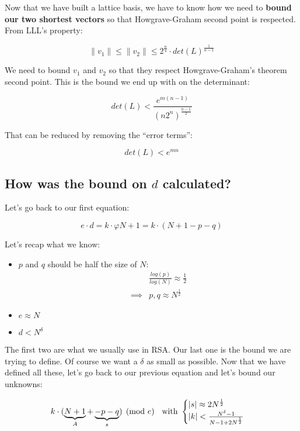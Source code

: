 \documentclass[a4paper,11pt]{article}
\begin{document}
Now that we have built a lattice basis, we have to know how we need to \textbf{bound our two shortest vectors} so that Howgrave-Graham second point is respected. From LLL's property:

\[ \|v_1\| \leq \|v_2\| \leq 2^{\frac{n}{4}} \cdot det(L)^{\frac{1}{n-1}} \]

We need to bound $v_1$ and $v_2$ so that they respect Howgrave-Graham's theorem second point. This is the bound we end up with on the determinant:

\[ det(L) < \frac{e^{m(n-1)}}{(n2^n)^{\frac{n-1}{2}}} \]

That can be reduced by removing the ``error terms'':

\[ det(L) < e^{mn} \]

\subsection{How was the bound on $d$ calculated?}\label{bound-boneh-durfee}

Let's go back to our first equation:

\[ e \cdot d = k \cdot \varphi{N} + 1 = k \cdot (N + 1 - p - q) \]

Let's recap what we know:

\begin{itemize}
	\item{$p$ and $q$ should be half the size of $N$:\\
	\begin{align*}
		 &\frac{log(p)}{log(N)} \approx \frac{1}{2}\\
		 \implies &p,q \approx N^{\frac{1}{2}}
	\end{align*}}
	\item{$e \approx N$}
	\item{$d < N^\delta$\\}
\end{itemize}

The first two are what we usually use in RSA. Our last one is the bound we are trying to define. Of course we want a $\delta$ as small as possible. Now that we have defined all these, let's go back to our previous equation and let's bound our unknowns:

\[ k \cdot ( \underbrace{N + 1}_A + \underbrace{-p-q}_s) \pmod{e}  \hspace{2mm} \mbox{ with } \begin{cases} |s| \approx 2N^{\frac{1}{2}} \\
 |k| < \frac{N^\delta - 1}{N - 1 + 2N^{\frac{1}{2}}}
 \end{cases} \]
 
\end{document}
